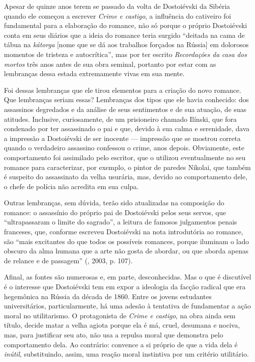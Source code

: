 Apesar de quinze anos terem se passado da volta de Dostoiévski da
Sibéria quando ele começou a escrever \emph{Crime e castigo}, a
influência do cativeiro foi fundamental para a elaboração do romance,
não só porque o próprio Dostoiévski conta em seus diários que a ideia do
romance teria surgido ``deitada na cama de tábua na \emph{kátorga}
[nome que se dá aos trabalhos forçados na Rússia] em dolorosos
momentos de tristeza e autocrítica'', mas por ter escrito
\emph{Recordações da casa dos mortos} três anos antes de sua obra
seminal, portanto por estar com as lembranças dessa estada extremamente
vivas em sua mente.

Foi dessas lembranças que ele tirou elementos para a criação do novo
romance. Que lembranças seriam essas? Lembranças dos tipos que ele havia
conhecido: dos assassinos degredados e da análise de seus sentimentos e
de sua atuação, de suas atitudes. Inclusive, curiosamente, de um
prisioneiro chamado Ilínski, que fora condenado por ter assassinado o
pai e que, devido à sua calma e serenidade, dava a impressão a
Dostoiévski de ser inocente --- impressão que se mostrou correta quando o
verdadeiro assassino confessou o crime, anos depois. Obviamente, este
comportamento foi assimilado pelo escritor, que o utilizou eventualmente
no seu romance para caracterizar, por exemplo, o pintor de paredes
Nikolai, que também é suspeito do assassinato da velha usurária, mas,
devido ao comportamento dele, o chefe de polícia não acredita em sua
culpa.

Outras lembranças, sem dúvida, terão sido atualizadas na composição do
romance: o assassínio do próprio pai de Dostoiévski pelos seus servos,
que ``ultrapassaram o limite do sagrado'', a leitura de famosos
julgamentos penais franceses, que, conforme escreveu Dostoiévski na nota
introdutória ao romance, são ``mais excitantes do que todos os possíveis
romances, porque iluminam o lado obscuro da alma humana que a arte não
gosta de abordar, ou que aborda apenas de relance e de passagem'' (, 2003, p. 107).

Afinal, as fontes são numerosas e, em parte, desconhecidas. Mas o que é
discutível é o interesse que Dostoiévski tem em expor a ideologia da
facção radical que era hegemônica na Rússia da década de 1860. Entre os
jovens estudantes universitários, particularmente, há uma adesão à
tentativa de fundamentar a ação moral no utilitarismo. O protagonista de
\emph{Crime e castigo}, na obra ainda sem título, decide matar a velha
agiota porque ela é má, cruel, desumana e nociva, mas, para justificar
seu ato, não usa a repulsa moral que demonstra pelo comportamento dela.
Ao contrário: convence a si próprio de que a vida dela é \emph{inútil},
substituindo, assim, uma reação moral instintiva por um critério
utilitário.


